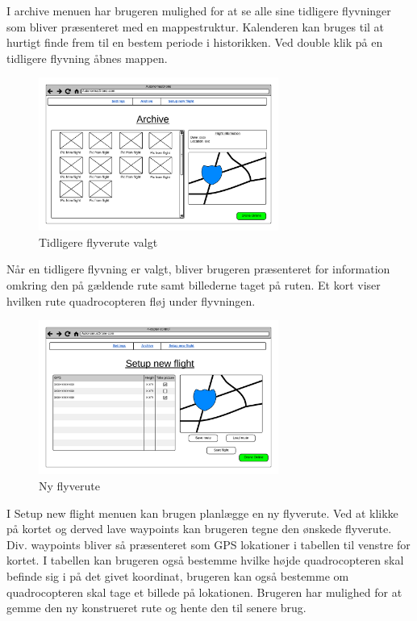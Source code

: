 I archive menuen har brugeren mulighed for at se alle sine tidligere flyvninger som bliver præsenteret med en mappestruktur. Kalenderen kan bruges til at hurtigt finde frem til en bestem periode i historikken. Ved double klik på en tidligere flyvning åbnes mappen.

\vspace{-5pt}
\begin{figure}[H]
	\centering
	\includegraphics[width=0.7\textwidth]{Billeder/UI_mockups/archive_choosen.png}
	\vspace{-5pt}
	\caption{Tidligere flyverute valgt}
	\label{fig:mockup_archive_choosen}
\end{figure}

Når en tidligere flyvning er valgt, bliver brugeren præsenteret for information omkring den på gældende rute samt billederne taget på ruten. Et kort viser hvilken rute quadrocopteren fløj under flyvningen.

\vspace{-5pt}
\begin{figure}[H]
	\centering
	\includegraphics[width=0.7\textwidth]{Billeder/UI_mockups/setup_new_flight.png}
	\vspace{-5pt}
	\caption{Ny flyverute}
	\label{fig:mockup_setup_new_flight}
\end{figure}

I Setup new flight menuen kan brugen planlægge en ny flyverute. Ved at klikke på kortet og derved lave waypoints kan brugeren tegne den ønskede flyverute. Div. waypoints bliver så præsenteret som GPS lokationer i tabellen til venstre for kortet. I tabellen kan brugeren også bestemme hvilke højde quadrocopteren skal befinde sig i på det givet koordinat, brugeren kan også bestemme om quadrocopteren skal tage et billede på lokationen. Brugeren har mulighed for at gemme den ny konstrueret rute og hente den til senere brug. 